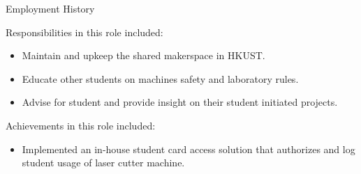 \documentclass{resume} %
\begin{document}
\begin{rSection}{Employment History}
    \hspace*{1cm}%
    \begin{minipage}{.8\textwidth}%
        
        Responsibilities in this role included:
        \begin{itemize}
            \item Maintain and upkeep the shared makerspace in HKUST.
            \item Educate other students on machines safety and laboratory rules.
            \item Advise for student and provide insight on their student initiated projects.
        \end{itemize}
        
        Achievements in this role included:
        \begin{itemize}
            \item Implemented an in-house student card access solution that authorizes and log student usage of laser cutter machine.
        \end{itemize}
        
    \end{minipage}%
\end{rSection}




\end{document}
